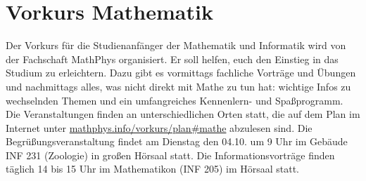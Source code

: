 \section{Vorkurs Mathematik}
\label{vkmathe}
Der Vorkurs für die Studienanfänger der Mathematik und Informatik wird von der
Fachschaft MathPhys organisiert. Er soll helfen, euch den Einstieg in das
Studium zu erleichtern. Dazu gibt es vormittags fachliche Vorträge und Übungen
und nachmittags alles, was nicht direkt mit Mathe zu tun hat: wichtige Infos zu
wechselnden Themen und ein umfangreiches Kennenlern- und Spaßprogramm. Die
Veranstaltungen finden an unterschiedlichen Orten statt, die auf dem Plan im
Internet unter \url{mathphys.info/vorkurs/plan\#mathe}
abzulesen sind. Die Begrüßungsveranstaltung findet am Dienstag den 04.10. um 9
Uhr im Gebäude \gls{INF} 231 (Zoologie) in großen Hörsaal statt. Die
Informationsvorträge finden täglich 14 bis 15 Uhr im Mathematikon
(\gls{INF} 205) im Hörsaal statt.
